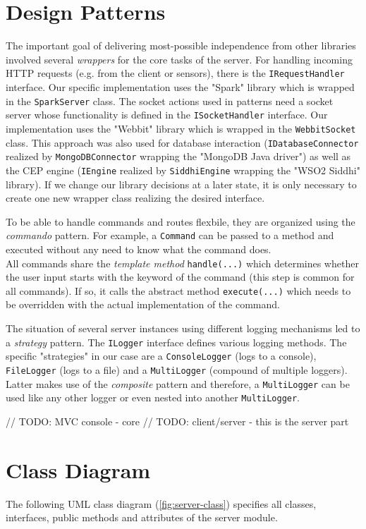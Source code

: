 \section{Design Patterns}
The important goal of delivering most-possible independence from other libraries
involved several \emph{wrappers} for the core tasks of the server.
For handling incoming HTTP requests (e.g. from the client or sensors), there is
the \texttt{IRequestHandler} interface. Our specific implementation uses
the "Spark" library which is wrapped in the \texttt{SparkServer} class.
The socket actions used in patterns need a socket server whose functionality is
defined in the \texttt{ISocketHandler} interface. Our implementation uses the
"Webbit" library which is wrapped in the \texttt{WebbitSocket} class.
This approach was also used for database interaction (\texttt{IDatabaseConnector}
realized by \texttt{MongoDBConnector} wrapping the "MongoDB Java driver") as well as
the CEP engine (\texttt{IEngine} realized by \texttt{SiddhiEngine} wrapping the
"WSO2 Siddhi" library). If we change our library decisions at a later state,
it is only necessary to create one new wrapper class realizing the desired interface.

To be able to handle commands and routes flexbile, they are organized using
the \emph{commando} pattern. For example, a \texttt{Command} can be passed to a
method and executed without any need to know what the command does. \\
All commands share the \emph{template method} \texttt{handle(...)} which
determines whether the user input starts with the keyword of the command
(this step is common for all commands). If so, it calls the abstract method
\texttt{execute(...)} which needs to be overridden with the actual implementation
of the command.

The situation of several server instances using different logging mechanisms
led to a \emph{strategy} pattern. The \texttt{ILogger} interface defines
various logging methods. The specific "strategies" in our case are a
\texttt{ConsoleLogger} (logs to a console), \texttt{FileLogger} (logs to a file)
and a \texttt{MultiLogger} (compound of multiple loggers). Latter makes use
of the \emph{composite} pattern and therefore, a \texttt{MultiLogger} can be used
like any other logger or even nested into another \texttt{MultiLogger}.

// TODO: MVC console - core
// TODO: client/server - this is the server part

\section{Class Diagram}
The following UML class diagram (\autoref{fig:server-class}) specifies all
classes, interfaces, public methods and attributes of the server module.

